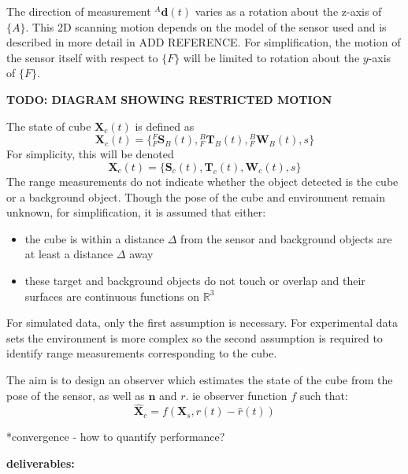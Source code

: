 The direction of measurement ${^{A}\mathbf{d}(t)}$ varies as a rotation about the z-axis of $\{A\}$. This 2D scanning motion depends on the model of the sensor used and is described in more detail in ADD REFERENCE. For simplification, the motion of the sensor itself with respect to $\{F\}$ will be limited to rotation about the $y$-axis of $\{F\}$.

\textbf{TODO: DIAGRAM SHOWING RESTRICTED MOTION}

The state of cube $\mathbf{X}_{c}(t)$ is defined as 
\begin{equation}
	\mathbf{X}_{c}(t) = 
	\{{^{F}_{F}\mathbf{S}^{}_{B}(t)},{^{B}_{F}\mathbf{T}^{}_{B}(t)},{^{B}_{F}\mathbf{W}^{}_{B}(t)},
	s\}
\end{equation}
For simplicity, this will be denoted
\begin{equation}
	\mathbf{X}_{c}(t) = 
	\{\mathbf{S}_{c}(t),\mathbf{T}_{c}(t),\mathbf{W}_{c}(t),s\}
\end{equation}
The range measurements do not indicate whether the object detected is the cube or a background object. Though the pose of the cube and environment remain unknown, for simplification, it is assumed that either:
\begin{itemize}
\item the cube is within a distance $\Delta$ from the sensor and background objects are at least a distance $\Delta$ away
\item these target and background objects do not touch or overlap and their surfaces are continuous functions on $\mathbb{R}^3$
\end{itemize}
For simulated data, only the first assumption is necessary. For experimental data sets the environment is more complex so the second assumption is required to identify range measurements corresponding to the cube. 

The aim is to design an observer which estimates the state of the cube from the pose of the sensor, as well as $\mathbf{n}$ and $r$. ie observer function $f$ such that:
\begin{equation}
	\hat{\mathbf{X}}_{c} = f(\mathbf{X}_{s},r(t)-\hat{r}(t))
\end{equation}

*convergence - how to quantify performance?









\textbf{deliverables:} \\

